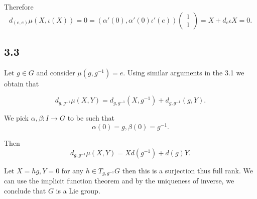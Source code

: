 \documentclass{article}
\numberwithin{equation}{section}
\begin{document}
Therefore
\begin{equation*}
d_{(e,e)}\mu(X,\iota(X)) = 0 = \left(\alpha'(0),\alpha'(0)\iota'(e)\right)\begin{pmatrix}1\\1\end{pmatrix} = X+d_e\iota X = 0.
\end{equation*}

\subsection*{3.3}

Let $g\in G$ and consider $\mu(g,g^{-1})=e$. Using similar arguments in the 3.1 we obtain that

\begin{equation*}
d_{g,g^{-1}}\mu(X,Y) = d_{g,g^{-1}}(X,g^{-1})+d_{g,g^{-1}}(g,Y).
\end{equation*}

We pick $\alpha,\beta:I\to G$ to be such that
\begin{equation*}
\alpha(0) = g, \beta(0) = g^{-1}.
\end{equation*} 

Then 
\begin{equation*}
d_{g,g^{-1}}\mu(X,Y) = Xd(g^{-1})+d(g)Y.
\end{equation*}

Let $X=hg, Y=0$ for any $h\in T_{g,g^{-1}}G$ then this is a surjection thus full rank. We can use the implicit function theorem and by the uniqueness of inverse, we conclude that $G$ is a Lie group.
\end{document}
